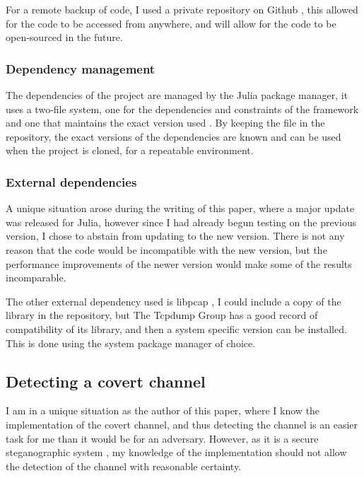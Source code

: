 For a remote backup of code, I used a private repository on Github \citep{github}, this allowed for the code to be accessed from anywhere, and will allow for the code to be open-sourced in the future.

\subsubsection{Dependency management}

The dependencies of the project are managed by the Julia package manager, it uses a two-file system, one for the dependencies and constraints of the framework  and one that maintains the exact version used . By keeping the  file in the repository, the exact versions of the dependencies are known and can be used when the project is cloned, for a repeatable environment.

\subsubsection{External dependencies}

A unique situation arose during the writing of this paper, where a major update was released for Julia, however since I had already begun testing on the previous version, I chose to abstain from updating to the new version. There is not any reason that the code would be incompatible with the new version, but the performance improvements of the newer version would make some of the results incomparable.

The other external dependency used is libpcap \citep{libpcap}, I could include a copy of the library in the repository, but The Tcpdump Group has a good record of compatibility of its library, and then a system specific version can be installed. This is done using the system package manager of choice. 

\subsection{Detecting a covert channel}

I am in a unique situation as the author of this paper, where I know the implementation of the covert channel, and thus detecting the channel is an easier task for me than it would be for an adversary. However, as it is a secure steganographic system \citep{SaW}, my knowledge of the implementation should not allow the detection of the channel with reasonable certainty.

